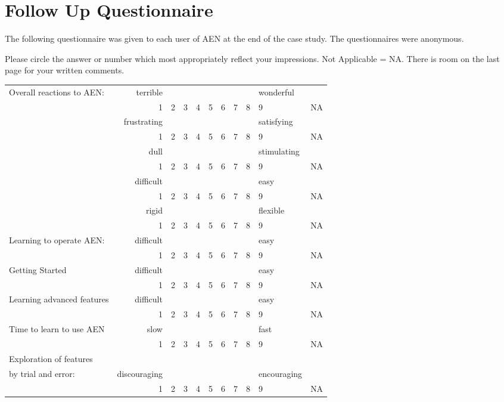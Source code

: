 \newpage
\chapter{Follow Up Questionnaire}
\label{app:questionnaire2}
The following questionnaire was given to each user of AEN at
the end of the case study.  The questionnaires were anonymous. %

\vspace{1cm}

\footnotesize

Please circle the answer or number which most appropriately reflect your
impressions.  Not Applicable = NA.  There is room on the last page for your
written comments.\\

\begin{tabular}{lrccccccclc}\\
\hline
Overall reactions to AEN:&terrible&&&&&&&&wonderful&\\
&1&2&3&4&5&6&7&8&9&NA\\
&frustrating&&&&&&&&satisfying&\\
&1&2&3&4&5&6&7&8&9&NA\\
&dull&&&&&&&&stimulating&\\
&1&2&3&4&5&6&7&8&9&NA\\
&difficult&&&&&&&&easy&\\
&1&2&3&4&5&6&7&8&9&NA\\
&rigid&&&&&&&&flexible&\\
&1&2&3&4&5&6&7&8&9&NA\\
\hline
Learning to operate AEN:&difficult&&&&&&&&easy&\\
&1&2&3&4&5&6&7&8&9&NA\\
\hline
Getting Started&difficult&&&&&&&&easy&\\
&1&2&3&4&5&6&7&8&9&NA\\
\hline
Learning advanced features&difficult&&&&&&&&easy&\\
&1&2&3&4&5&6&7&8&9&NA\\
\hline
Time to learn to use AEN&slow&&&&&&&&fast&\\
&1&2&3&4&5&6&7&8&9&NA\\
\hline
Exploration of features\\
 by trial and error:&discouraging&&&&&&&&encouraging&\\
&1&2&3&4&5&6&7&8&9&NA\\
\hline
\end{tabular}

